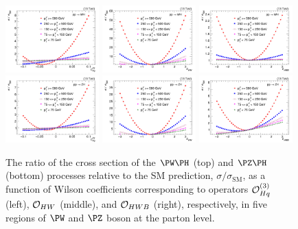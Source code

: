 \documentclass[a4paper,11pt]{article}
\begin{document}
\begin{figure}[t]
\begin{center}
\includegraphics[width=0.321\textwidth]{Figures/New/LHE/WH/Canv_cpq3i.png}
\includegraphics[width=0.321\textwidth]{Figures/New/LHE/WH/Canv_cpW.png}
\includegraphics[width=0.321\textwidth]{Figures/New/LHE/WH/Canv_cpWB.png}
\includegraphics[width=0.321\textwidth]{Figures/New/LHE/ZH/Canv_cpq3i.png}
\includegraphics[width=0.321\textwidth]{Figures/New/LHE/ZH/Canv_cpW.png}
\includegraphics[width=0.321\textwidth]{Figures/New/LHE/ZH/Canv_cpWB.png}
\end{center}
\caption{
The ratio of the cross section of the $\PW\PH$ (top) and $\PZ\PH$ (bottom) processes relative to the SM prediction, $\sigma/\sigma_{\textrm{SM}}$, as a function of Wilson coefficients corresponding to operators ${\cal O}^{(3)}_{Hq}$ (left), ${\cal O}_{HW}$ (middle), and ${\cal O}_{HWB}$ (right), respectively, in five regions of $\PW$ and $\PZ$ boson {\pt} at the parton level.
}
\label{fig:LHE_WZH}
\end{figure}
\end{document}
